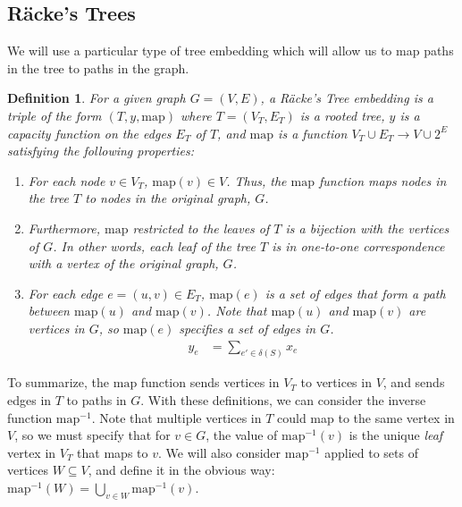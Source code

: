 \documentclass[12pt]{article}
\newtheorem{definition}{Definition}
\begin{document}
\subsection{R\"{a}cke's Trees}

We will use a particular type of tree embedding which will allow us to map paths in the tree to paths in the graph. 

\begin{definition}
For a given graph $G = (V, E)$, a R\"{a}cke's Tree embedding is a triple of the form $(T,y,\mathrm{map})$ where $T = (V_T,E_T)$ is a rooted tree, $y$ is a capacity function on the edges $E_T$ of $T$, and $\mathrm{map}$ is a function $V_T \cup E_T \to V \cup 2^E$ satisfying the following properties:
\begin{enumerate}
\item For each node $v \in V_T$, $\mathrm{map}(v) \in V$. Thus, the $\mathrm{map}$ function maps nodes in the tree $T$ to nodes in the original graph, $G$.
\item Furthermore, $\mathrm{map}$ restricted to the leaves of $T$ is a bijection with the vertices of $G$. In other words, each leaf of the tree $T$ is in one-to-one correspondence with a vertex of the original graph, $G$.
\item For each edge $e = (u,v) \in E_T$, $\mathrm{map}(e)$ is a set of edges that form a path between $\mathrm{map}(u)$ and $\mathrm{map}(v)$. Note that $\mathrm{map}(u)$ and $\mathrm{map}(v)$ are vertices in $G$, so $\mathrm{map}(e)$ specifies a set of edges in $G$.
\begin{align}
y_e &= \sum_{e' \in \delta(S)} x_e
\end{align}
\end{enumerate}
\end{definition}

To summarize, the $\mathrm{map}$ function sends vertices in $V_T$ to vertices in $V$, and sends edges in $T$ to paths in $G$. With these definitions, we can consider the inverse function $\mathrm{map}^{-1}$. Note that multiple vertices in $T$ could map to the same vertex in $V$, so we must specify that for $v \in G$, the value of $\mathrm{map}^{-1}(v)$ is the unique \emph{leaf} vertex in $V_T$ that maps to $v$. We will also consider $\mathrm{map}^{-1}$ applied to sets of vertices $W \subseteq V$, and define it in the obvious way: $\mathrm{map}^{-1}(W) = \bigcup_{v \in W} \mathrm{map}^{-1}(v)$.
\end{document}
